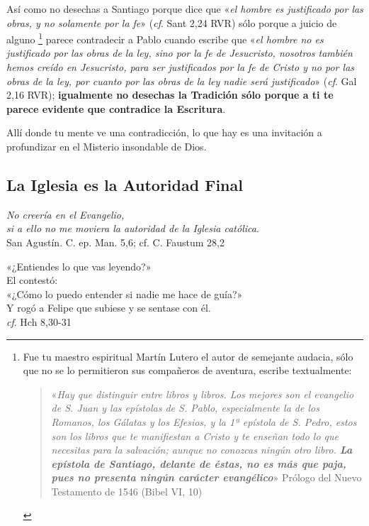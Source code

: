 \documentclass{article}
\begin{document}
Así como no desechas a Santiago porque dice que «\emph{el hombre es justificado por las obras, y no solamente por la fe}» (\emph{cf}. Sant 2,24 RVR) sólo porque a juicio de alguno%
    \footnote{Fue tu maestro espiritual Martín Lutero el autor de semejante audacia, sólo que no se lo permitieron sus compañeros de aventura, escribe textualmente:
    
    \begin{quote}
    «\emph{Hay que distinguir entre libros y libros. Los mejores son el evangelio de S. Juan y las epístolas de S. Pablo, especialmente la de los Romanos, los Gálatas y los Efesios, y la 1ª epístola de S. Pedro, estos son los libros que te manifiestan a Cristo y te enseñan todo lo que necesitas para la salvación; aunque no conozcas ningún otro libro. \textbf{La epístola de Santiago, delante de éstas, no es más que paja, pues no presenta ningún carácter evangélico}}»
    Prólogo del Nuevo Testamento de 1546 (Bibel VI, 10)
    \end{quote}
    }
parece contradecir a Pablo cuando escribe que «\emph{el hombre no es justificado por las obras de la ley, sino por la fe de Jesucristo, nosotros también hemos creído en Jesucristo, para ser justificados por la fe de Cristo y no por las obras de la ley, por cuanto por las obras de la ley nadie será justificado}» (\emph{cf}. Gal 2,16 RVR); \textbf{igualmente no desechas la Tradición sólo porque a ti te parece evidente que contradice la Escritura}.

Allí donde tu mente ve una contradicción, lo que hay es una invitación a profundizar en el Misterio insondable de Dios.

\subsection*{La Iglesia es la Autoridad Final}

\begin{flushright}
\emph{No creería en el Evangelio,\\
si a ello no me moviera la autoridad de la Iglesia católica}.\\
San Agustín. C. ep. Man. 5,6; cf. C. Faustum 28,2
\end{flushright}

\begin{flushright}
«¿Entiendes lo que vas leyendo?»\\
El contestó: \\
«¿Cómo lo puedo entender si nadie me hace de guía?»\\
Y rogó a Felipe que subiese y se sentase con él.\\
\emph{cf}. Hch 8,30-31
\end{flushright}
\end{document}
